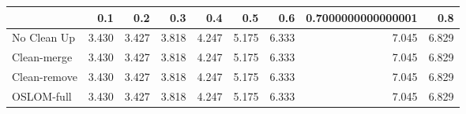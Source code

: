 \begin{tabular}{lrrrrrrrr}
\toprule
{} &   0.1 &   0.2 &   0.3 &   0.4 &   0.5 &   0.6 & 0.7000000000000001 &   0.8 \\
\midrule
No Clean Up  & 3.430 & 3.427 & 3.818 & 4.247 & 5.175 & 6.333 &              7.045 & 6.829 \\
Clean-merge  & 3.430 & 3.427 & 3.818 & 4.247 & 5.175 & 6.333 &              7.045 & 6.829 \\
Clean-remove & 3.430 & 3.427 & 3.818 & 4.247 & 5.175 & 6.333 &              7.045 & 6.829 \\
OSLOM-full   & 3.430 & 3.427 & 3.818 & 4.247 & 5.175 & 6.333 &              7.045 & 6.829 \\
\bottomrule
\end{tabular}
